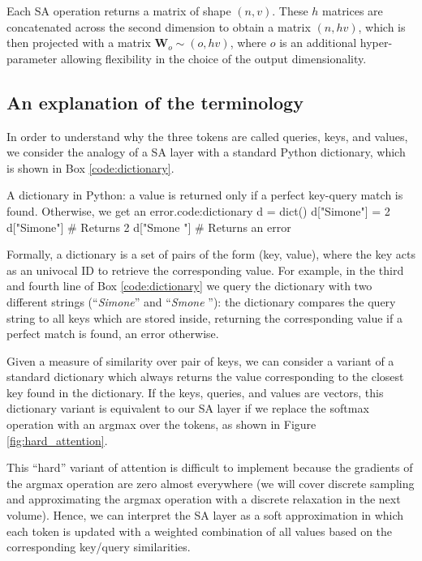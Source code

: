 \vspace{0.5em}
Each SA operation returns a matrix of shape $(n,v)$. These $h$ matrices are concatenated across the second dimension to obtain a matrix $(n,hv)$, which is then projected with a matrix $\mathbf{W}_o \sim (o,hv)$, where $o$ is an additional hyper-parameter allowing flexibility in the choice of the output dimensionality.

\subsection*{An explanation of the terminology} 

In order to understand why the three tokens are called queries, keys, and values, \addteacup we consider the analogy of a SA layer with a standard Python dictionary, which is shown in Box \ref{code:dictionary}. 

\begin{mypy}{A dictionary in Python: a value is returned only if a perfect key-query match is found. Otherwise, we get an error.}{code:dictionary}
d = dict()
d["Simone"] = 2
d["Simone"]       # Returns 2
d["Smone "]       # Returns an error
\end{mypy}

Formally, a dictionary is a set of pairs of the form (key, value), where the key acts as an univocal ID to retrieve the corresponding value. For example, in the third and fourth line of Box \ref{code:dictionary} we query the dictionary with two different strings (“\textit{Simone}” and “\textit{Smone }”): the dictionary compares the query string to all keys which are stored inside, returning the corresponding value if a perfect match is found, an error otherwise.

Given a measure of similarity over pair of keys, we can consider a variant of a standard dictionary which always returns the value corresponding to the closest key found in the dictionary. If the keys, queries, and values are vectors, this dictionary variant is equivalent to our SA layer if we replace the softmax operation with an argmax over the tokens, as shown in Figure \ref{fig:hard_attention}.

This “hard” variant of attention is difficult to implement because the gradients of the argmax operation are zero almost everywhere (we will cover discrete sampling and approximating the argmax operation with a discrete relaxation in the next volume). Hence, we can interpret the SA layer as a soft approximation in which each token is updated with a weighted combination of all values based on the corresponding key/query similarities.

